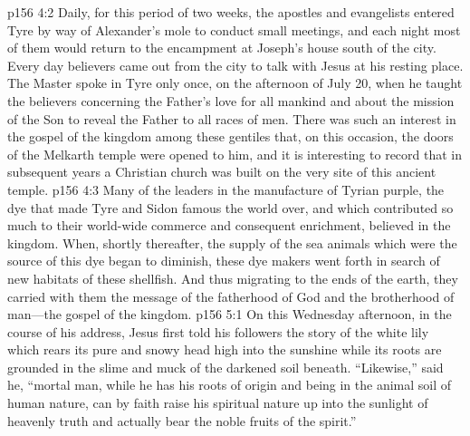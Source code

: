 \vs p156 4:2 Daily, for this period of two weeks, the apostles and evangelists entered Tyre by way of Alexander’s mole to conduct small meetings, and each night most of them would return to the encampment at Joseph’s house south of the city. Every day believers came out from the city to talk with Jesus at his resting place. The Master spoke in Tyre only once, on the afternoon of July 20, when he taught the believers concerning the Father’s love for all mankind and about the mission of the Son to reveal the Father to all races of men. There was such an interest in the gospel of the kingdom among these gentiles that, on this occasion, the doors of the Melkarth temple were opened to him, and it is interesting to record that in subsequent years a Christian church was built on the very site of this ancient temple.
\vs p156 4:3 Many of the leaders in the manufacture of Tyrian purple, the dye that made Tyre and Sidon famous the world over, and which contributed so much to their world\hyp{}wide commerce and consequent enrichment, believed in the kingdom. When, shortly thereafter, the supply of the sea animals which were the source of this dye began to diminish, these dye makers went forth in search of new habitats of these shellfish. And thus migrating to the ends of the earth, they carried with them the message of the fatherhood of God and the brotherhood of man---the gospel of the kingdom.
\vs p156 5:1 On this Wednesday afternoon, in the course of his address, Jesus first told his followers the story of the white lily which rears its pure and snowy head high into the sunshine while its roots are grounded in the slime and muck of the darkened soil beneath. \textcolor{ubdarkred}{“Likewise,”} said he, \textcolor{ubdarkred}{“mortal man, while he has his roots of origin and being in the animal soil of human nature, can by faith raise his spiritual nature up into the sunlight of heavenly truth and actually bear the noble fruits of the spirit.”}
